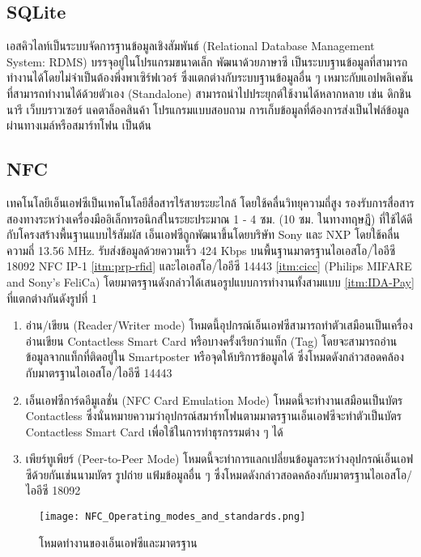\documentclass[a4paper]{article}
\begin{document}
\subsection{SQLite}
เอสคิวไลท์เป็นระบบจัดการฐานข้อมูลเชิงสัมพันธ์ (Relational Database Management System: RDMS) บรรจุอยู่ในโปรแกรมขนาดเล็ก พัฒนาด้วยภาษาซี เป็นระบบฐานข้อมูลที่สามารถทำงานได้โดยไม่จำเป็นต้องพึ่งพาเซิร์ฟเวอร์ ซึ่งแตกต่างกับระบบฐานข้อมูลอื่น ๆ เหมาะกับแอปพลิเคชันที่สามารถทำงานได้ด้วยตัวเอง (Standalone) สามารถนำไปประยุกต์ใช้งานได้หลากหลาย เช่น ดิกชินนารี เว็บบราวเซอร์ แคตาล็อคสินค้า โปรแกรมแบบสอบถาม การเก็บข้อมูลที่ต้องการส่งเป็นไฟล์ข้อมูลผ่านทางเมล์หรือสมาร์ทโฟน เป็นต้น

\subsection{NFC}
เทคโนโลยีเอ็นเอฟซีเป็นเทคโนโลยีสื่อสารไร้สายระยะไกล้ โดยใช้คลื่นวิทยุความถี่สูง รองรับการสื่อสารสองทางระหว่างเครื่องมืออิเล็กทรอนิกส์ในระยะประมาณ 1 - 4 ซม. (10 ซม. ในทางทฤษฎี) ที่ใช้ได้ดีกับโครงสร้างพื้นฐานแบบไร้สัมผัส เอ็นเอฟซีถูกพัฒนาขึ้นโดยบริษัท Sony และ NXP โดยใช้คลื่นความถี่ 13.56 MHz. รับส่งข้อมูลด้วยความเร็ว 424 Kbps บนพื้นฐานมาตรฐานไอเอสโอ/ไออีซี 18092 NFC IP-1 \ref{itm:prp-rfid} และไอเอสโอ/ไออีซี 14443 \ref{itm:cicc} (Philips MIFARE and Sony’s FeliCa) โดยมาตรฐานดังกล่าวได้เสนอรูปแบบการทำงานทั้งสามแบบ \ref{itm:IDA-Pay} ที่แตกต่างกันดังรูปที่ 1 

\begin{enumerate}
	\item อ่าน/เขียน (Reader/Writer mode) โหมดนี้อุปกรณ์เอ็นเอฟซีสามารถทำตัวเสมือนเป็นเครื่องอ่านเขียน Contactless Smart Card หรือบางครั้งเรียกว่าแท็ก (Tag) โดยจะสามารถอ่านข้อมูลจากแท็กที่ติดอยู่ใน Smartposter หรือจุดให้บริการข้อมูลได้ ซึ่งโหมดดังกล่าวสอดคล้องกับมาตรฐานไอเอสโอ/ไออีซี 14443
  	\item เอ็นเอฟซีการ์ดอีมูเลชั่น (NFC Card Emulation Mode) โหมดนี้จะทำงานเสมือนเป็นบัตร Contactless ซึ่งนั่นหมายความว่าอุปกรณ์สมาร์ทโฟนตามมาตรฐานเอ็นเอฟซีจะทำตัวเป็นบัตร Contactless Smart Card เพื่อใช้ในการทำธุรกรรมต่าง ๆ ได้
  	\item เพียร์ทูเพียร์ (Peer-to-Peer Mode) โหมดนี้จะทำการแลกเปลี่ยนข้อมูลระหว่างอุปกรณ์เอ็นเอฟซีด้วยกันเช่นนามบัตร รูปถ่าย แฟ้มข้อมูลอื่น ๆ ซึ่งโหมดดังกล่าวสอดคล้องกับมาตรฐานไอเอสโอ/ไออีซี 18092
\end{enumerate}

\begin{figure}[ht!]
\centering
\texttt{[image: NFC\_Operating\_modes\_and\_standards.png]}
\caption{โหมดทำงานของเอ็นเอฟซีและมาตรฐาน}
\label{overflow}
\end{figure}
\end{document}
